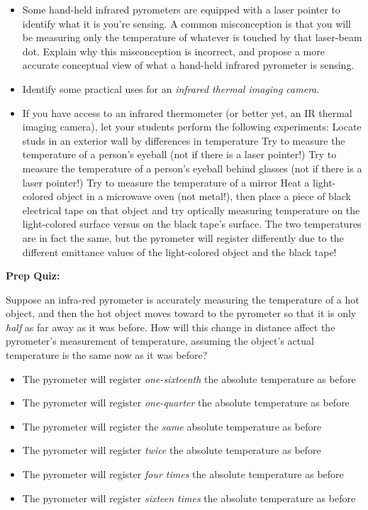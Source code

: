 \begin{itemize}
\item{} Some hand-held infrared pyrometers are equipped with a laser pointer to identify what it is you're sensing.  A common misconception is that you will be measuring only the temperature of whatever is touched by that laser-beam dot.  Explain why this misconception is incorrect, and propose a more accurate conceptual view of what a hand-held infrared pyrometer is sensing.
\item{} Identify some practical uses for an {\it infrared thermal imaging camera}.
\item{} If you have access to an infrared thermometer (or better yet, an IR thermal imaging camera), let your students perform the following experiments:
\itemitem{} Locate studs in an exterior wall by differences in temperature
\itemitem{} Try to measure the temperature of a person's eyeball (not if there is a laser pointer!)
\itemitem{} Try to measure the temperature of a person's eyeball behind glasses (not if there is a laser pointer!)
\itemitem{} Try to measure the temperature of a mirror
\itemitem{} Heat a light-colored object in a microwave oven (not metal!), then place a piece of black electrical tape on that object and try optically measuring temperature on the light-colored surface versus on the black tape's surface.  The two temperatures are in fact the same, but the pyrometer will register differently due to the different emittance values of the light-colored object and the black tape!
\end{itemize}












\vfil \eject

\noindent
{\bf Prep Quiz:}

Suppose an infra-red pyrometer is accurately measuring the temperature of a hot object, and then the hot object moves toward to the pyrometer so that it is only {\it half} as far away as it was before.  How will this change in distance affect the pyrometer's measurement of temperature, assuming the object's actual temperature is the same now as it was before?

\begin{itemize}
\item{} The pyrometer will register {\it one-sixteenth} the absolute temperature as before 
\vskip 5pt 
\item{} The pyrometer will register {\it one-quarter} the absolute temperature as before
\vskip 5pt 
\item{} The pyrometer will register the {\it same} absolute temperature as before 
\vskip 5pt 
\item{} The pyrometer will register {\it twice} the absolute temperature as before 
\vskip 5pt 
\item{} The pyrometer will register {\it four times} the absolute temperature as before 
\vskip 5pt 
\item{} The pyrometer will register {\it sixteen times} the absolute temperature as before 
\end{itemize}

